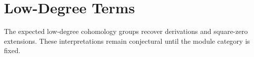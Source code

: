 \section{Low-Degree Terms}

The expected low-degree cohomology groups recover derivations and square-zero
extensions. These interpretations remain conjectural until the module category
is fixed.
